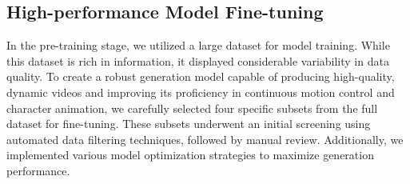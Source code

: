 \subsection{High-performance Model Fine-tuning}\label{sft}
In the pre-training stage, we utilized a large dataset for model training. While this dataset is rich in information, it displayed considerable variability in data quality. To create a robust generation model capable of producing high-quality, dynamic videos and improving its proficiency in continuous motion control and character animation, we carefully selected four specific subsets from the full dataset for fine-tuning.
These subsets underwent an initial screening using automated data filtering techniques, followed by manual review. Additionally, we implemented various model optimization strategies to maximize generation performance.


